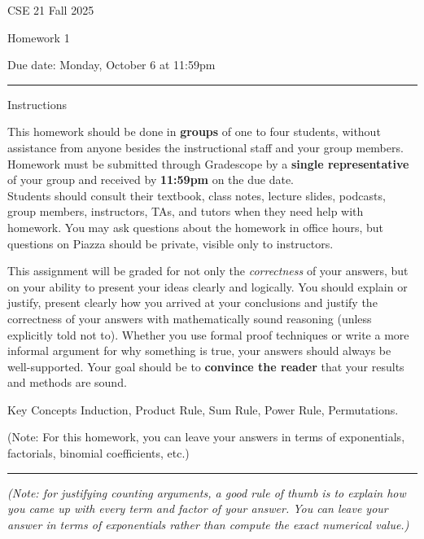 \documentclass[10pt,letterpaper,unboxed,cm]{article}
\begin{document}
\hfill{CSE 21 Fall 2025}

\hfill{Homework 1}

\hfill{Due date: Monday, October 6 at 11:59pm}

\begin{center}
\begin{minipage}[t]{5.7in}
\rule{\linewidth}{2pt}
{\sc Instructions}\newline

This homework should be done in {\bf groups} of one to four students, without assistance from anyone besides the instructional staff and your group members.  Homework must be submitted through Gradescope by a {\bf single representative} of your group and received by {\bf 11:59pm} on the due date.\\
 

Students should consult their textbook, class notes, lecture slides, podcasts, group members, instructors, TAs, and tutors when 
they need help with homework. You may ask questions about the homework in office hours, but questions on Piazza should be private, visible only to instructors. 

This assignment will be graded for not only the \emph{correctness} of your answers, but on your ability to present your ideas clearly and logically. You should explain or justify, present clearly how you arrived at your conclusions and justify the correctness of your answers with mathematically sound reasoning (unless explicitly told not to). Whether you use formal proof techniques or write a more informal argument for why something is true, your answers should always be well-supported. Your goal should be to {\bf convince the reader} that your results and methods are sound.






{\sc Key Concepts} Induction, Product Rule, Sum Rule, Power Rule, Permutations.

(Note: For this homework, you can leave your answers in terms of exponentials, factorials, binomial coefficients, etc.)

\rule{\linewidth}{2pt}
\end{minipage} \hfill

\end{center}

\emph{(Note: for justifying counting arguments, a good rule of thumb is to explain how you came up with every term and factor of your answer. You can leave
your answer in terms of exponentials rather than compute the exact numerical value.)}
\end{document}
